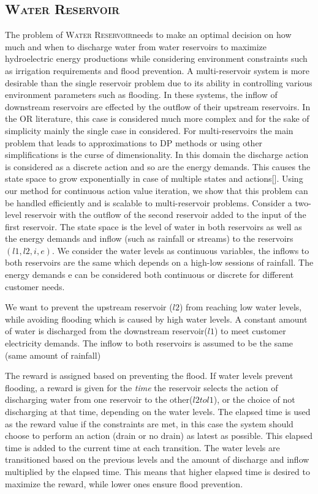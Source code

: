 \documentclass[letterpaper]{article}
\newcommand{\WaterReservoir}{\textsc{Water Reservoir}}
\begin{document}
\subsection{\WaterReservoir}The problem of \WaterReservoir needs to make an optimal decision on how much and when to discharge water from water reservoirs to maximize hydroelectric energy productions while considering environment constraints such as irrigation requirements and flood prevention. 
A multi-reservoir system is more desirable than the single reservoir problem due to its ability in controlling various environment parameters such as flooding.  In these systems, the inflow of downstream reservoirs are effected by the outflow of their upstream reservoirs. In the OR literature, this case  is considered much more complex and for the sake of simplicity mainly the single case in considered. For multi-reservoirs the main problem that leads to approximations to DP methods or using other simplifications is the curse of dimensionality. In this domain the discharge action is considered as a discrete action  and so are the energy demands. This causes the state space to grow exponentially in case of multiple states and actions[].
Using our method for continuous action value iteration, we show that this problem can be handled efficiently and is scalable to multi-reservoir problems. Consider a two-level reservoir with the outflow of the second reservoir added to the input of the first reservoir. The state space is the level of water in both reservoirs as well as the energy demands and inflow (such as rainfall or streams) to the reservoirs $(l1,l2,i,e)$. We consider the water levels as continuous variables, the inflows to both reservoirs are the same which depends on a high-low sessions of rainfall. The energy demands e can be considered both continuous or discrete for different customer needs. 

We want to prevent the upstream reservoir ($l2$) from reaching low water levels, while avoiding flooding which is caused by high water levels. A constant amount of water is discharged from the downstream reservoir($l1$) to meet customer electricity demands. The inflow to both reservoirs is assumed to be the same (same amount of rainfall) 

The reward is assigned based on preventing the flood. If water levels prevent flooding, a reward is given for the \textit{time} the reservoir selects the action of discharging water from one reservoir to the other($l2 to l1$), or the choice of not discharging at that time, depending on the water levels. The elapsed time is used as the reward value if the constraints are met, in this case the system should choose to perform an action (drain or no drain) as latest as possible. 
This elapsed time is added to the current time at each transition. The water levels are transitioned based on the previous levels and the amount of discharge and inflow multiplied by the elapsed time. This means that higher elapsed time is desired to maximize the reward, while lower ones ensure flood prevention.
\end{document}
